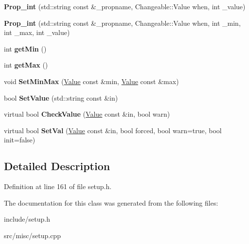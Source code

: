 \begin{DoxyCompactItemize}
\item 
\hypertarget{classProp__int_ab8c1f3f50ceaf2e36e3aab48253d2250}{{\bfseries Prop\-\_\-int} (std\-::string const \&\-\_\-propname, Changeable\-::\-Value when, int \-\_\-value)}\label{classProp__int_ab8c1f3f50ceaf2e36e3aab48253d2250}

\item 
\hypertarget{classProp__int_ac60562cfca6336553db06cf561819bb7}{{\bfseries Prop\-\_\-int} (std\-::string const \&\-\_\-propname, Changeable\-::\-Value when, int \-\_\-min, int \-\_\-max, int \-\_\-value)}\label{classProp__int_ac60562cfca6336553db06cf561819bb7}

\item 
\hypertarget{classProp__int_aad26bd6a145d1ca391951ae4b15e625d}{int {\bfseries get\-Min} ()}\label{classProp__int_aad26bd6a145d1ca391951ae4b15e625d}

\item 
\hypertarget{classProp__int_ac2c53ae3bfb50553e3dc518c19df83db}{int {\bfseries get\-Max} ()}\label{classProp__int_ac2c53ae3bfb50553e3dc518c19df83db}

\item 
\hypertarget{classProp__int_a5ddfd86051b921d5102fa76649bc145a}{void {\bfseries Set\-Min\-Max} (\hyperlink{classValue}{Value} const \&min, \hyperlink{classValue}{Value} const \&max)}\label{classProp__int_a5ddfd86051b921d5102fa76649bc145a}

\item 
\hypertarget{classProp__int_ad4aa382f6c4d02d5fd465e592ca50fdc}{bool {\bfseries Set\-Value} (std\-::string const \&in)}\label{classProp__int_ad4aa382f6c4d02d5fd465e592ca50fdc}

\item 
\hypertarget{classProp__int_a083e5487ae2544d805324fe8b0d3bc7d}{virtual bool {\bfseries Check\-Value} (\hyperlink{classValue}{Value} const \&in, bool warn)}\label{classProp__int_a083e5487ae2544d805324fe8b0d3bc7d}

\item 
\hypertarget{classProp__int_abd27dc79ac34b59f121f98214f613fb2}{virtual bool {\bfseries Set\-Val} (\hyperlink{classValue}{Value} const \&in, bool forced, bool warn=true, bool init=false)}\label{classProp__int_abd27dc79ac34b59f121f98214f613fb2}

\end{DoxyCompactItemize}


\subsection{Detailed Description}


Definition at line 161 of file setup.\-h.



The documentation for this class was generated from the following files\-:\begin{DoxyCompactItemize}
\item 
include/setup.\-h\item 
src/misc/setup.\-cpp\end{DoxyCompactItemize}
